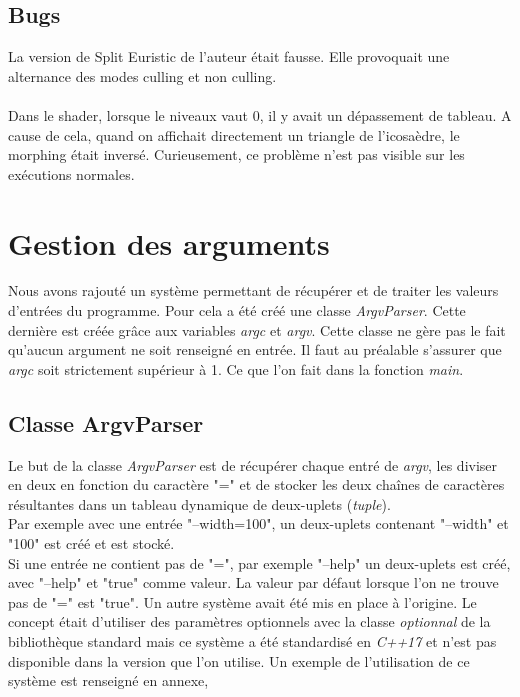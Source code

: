   \subsection{Bugs}
  \label{sec:culling_bug}
  La version de Split Euristic de l'auteur était fausse. Elle provoquait une alternance des modes culling et non culling.\\\\
  
  Dans le shader, lorsque le niveaux vaut 0, il y avait un dépassement de tableau. A cause de cela, quand on affichait directement un triangle de l'icosaèdre, le morphing était inversé. Curieusement, ce problème n'est pas visible sur les exécutions normales.

  \section{Gestion des arguments}
  Nous avons rajouté un système permettant de récupérer et de traiter les valeurs d'entrées du programme.
  Pour cela a été créé une classe \textit{ArgvParser}. Cette dernière est créée grâce aux variables \textit{argc} et \textit{argv}. 
  Cette classe ne gère pas le fait qu'aucun argument ne soit renseigné en entrée. Il faut au préalable s'assurer que \textit{argc} soit strictement supérieur à 1. Ce que l'on fait dans la fonction \textit{main}.\\
  
  \subsection{Classe ArgvParser}
  \label{sec:argvparser}
  
  Le but de la classe \textit{ArgvParser} est de récupérer chaque entré de \textit{argv}, les diviser en deux en fonction du caractère "=" et de stocker les deux chaînes de caractères résultantes dans un tableau dynamique de deux-uplets (\textit{tuple}).\\
  
  Par exemple avec une entrée "--width=100", un deux-uplets contenant "--width" et "100" est créé et est stocké.\\
  Si une entrée ne contient pas de "=", par exemple "--help" un deux-uplets est créé, avec "--help" et "true" comme valeur. La valeur par défaut lorsque l'on ne trouve pas de "=" est "true".
  Un autre système avait été mis en place à l'origine. Le concept était d'utiliser des paramètres optionnels
  avec la classe \textit{optionnal} de la bibliothèque standard mais ce système a été standardisé en \textit{C++17} et n'est pas disponible dans la version que l'on utilise. Un exemple de l'utilisation de ce système est renseigné en annexe, 
  
